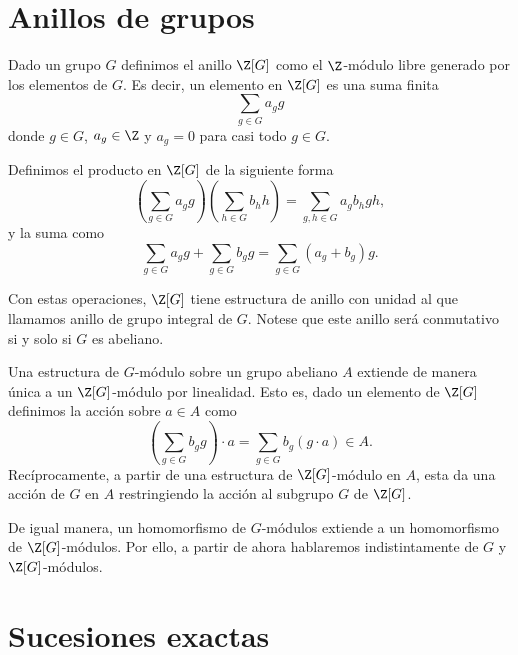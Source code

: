%

\section{Anillos de grupos}

Dado un grupo $G$ definimos el anillo $\Z[G]$ como el $\Z$-módulo libre generado por los elementos de $G$. Es decir, un elemento en $\Z[G]$ es una suma finita
\begin{equation*}
	\sum_{g\in G} a_gg
\end{equation*}
donde $g\in G$, $a_g\in \Z$ y $a_g=0$ para casi todo $g\in G$.

Definimos el producto en $\Z[G]$ de la siguiente forma $$\left(\sum_{g\in G} a_gg\right) \left(\sum_{h\in G}b_hh\right) = \sum_{g,h\in G} a_gb_hgh,$$ y la suma como $$ \sum_{g\in G} a_gg + \sum_{g\in G}b_gg = \sum_{g\in G}(a_g+b_g)g.$$

Con estas operaciones, $\Z[G]$ tiene estructura de anillo con unidad al que llamamos anillo de grupo integral de $G$. Notese que este anillo será conmutativo si y solo si $G$ es abeliano.

\begin{observacion}
	Una estructura de $G$-módulo sobre un grupo abeliano $A$ extiende de manera única a un $\Z[G]$-módulo por linealidad. Esto es, dado un elemento de $\Z[G]$ definimos la acción sobre $a\in A$ como
	$$ \left(\sum_{g\in G}b_gg\right)\cdot a = \sum_{g\in G}b_g(g\cdot a) \in A.$$
	 Recíprocamente, a partir de una estructura de $\Z[G]$-módulo en $A$, esta da una acción de $G$ en $A$ restringiendo la acción al subgrupo $G$ de $\Z[G]$.
	
	De igual manera, un homomorfismo de $G$-módulos extiende a un homomorfismo de $\Z[G]$-módulos.
	Por ello, a partir de ahora hablaremos indistintamente de $G$ y $\Z[G]$-módulos.
\end{observacion}

\section{Sucesiones exactas}


